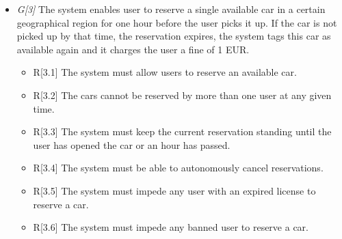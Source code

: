 \begin{itemize}
				\item \textit{G[3]} The system enables user to reserve a single available car in a certain geographical region for one hour before the user picks it up. If the car is not picked up by that time, the reservation expires, the system tags this car as available again and it charges the user a fine of 1 EUR.
					\begin{itemize}
						\item R[3.1] The system must allow users to reserve an available car.
						\item R[3.2] The cars cannot be reserved by more than one user at any given time.
						\item R[3.3] The system must keep the current reservation standing until the user has opened the car or an hour has passed. %
						\item R[3.4] The system must be able to autonomously cancel reservations.
						
						\item R[3.5] The system must impede any user with an expired license to reserve a car.
						\item R[3.6] The system must impede any banned user to reserve a car.
					\end{itemize}


\end{itemize}
